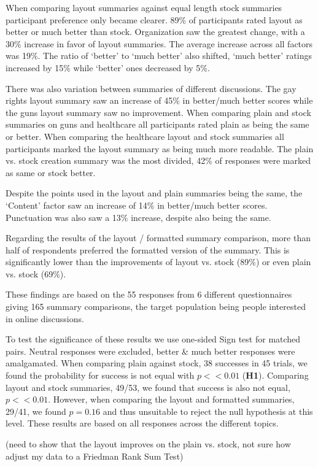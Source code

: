       When comparing layout summaries against equal length stock summaries participant preference only became clearer. 89\% of participants rated layout as better or much better than stock. Organization saw the greatest change, with a 30\% increase in favor of layout summaries. The average increase across all factors was 19\%. The ratio of `better' to `much better' also shifted, `much better' ratings increased by 15\% while `better' ones decreased by 5\%.

      There was also variation between summaries of different discussions. The gay rights layout summary saw an increase of 45\% in better/much better scores while the guns layout summary saw no improvement. When comparing plain and stock summaries on guns and healthcare all participants rated plain as being the same or better. When comparing the healthcare layout and stock summaries all participants marked the layout summary as being much more readable. The plain vs. stock creation summary was the most divided, 42\% of responses were marked as same or stock better.

      Despite the points used in the layout and plain summaries being the same, the `Content' factor saw an increase of 14\% in better/much better scores. Punctuation was also saw a 13\% increase, despite also being the same.

      Regarding the results of the layout / formatted summary comparison, more than half of respondents preferred the formatted version of the summary. This is significantly lower than the improvements of layout vs. stock (89\%) or even plain vs. stock (69\%).

      These findings are based on the 55 responses from 6 different questionnaires giving 165 summary comparisons, the target population being people interested in online discussions.

      To test the significance of these results we use one-sided Sign test for matched pairs. Neutral responses were excluded, better \& much better responses were amalgamated. When comparing plain against stock, 38 successes in 45 trials, we found the probability for success is not equal with $p << 0.01$ (\textbf{H1}). Comparing layout and stock summaries, 49/53, we found that success is also not equal, $p << 0.01$. However, when comparing the layout and formatted summaries, 29/41, we found $p = 0.16$ and thus unsuitable to reject the null hypothesis at this level. These results are based on all responses across the different topics.

      (need to show that the layout improves on the plain vs. stock, not sure how adjust my data to a Friedman Rank Sum Test)

